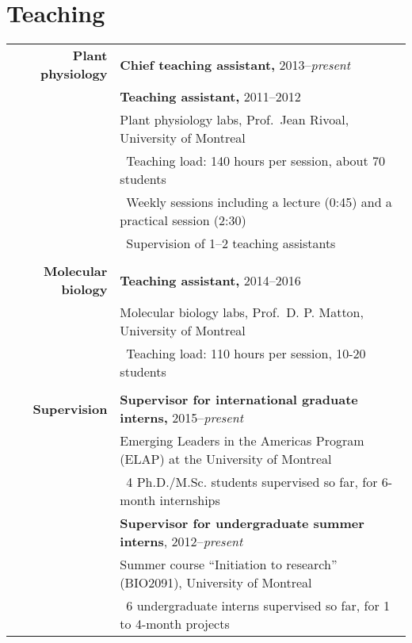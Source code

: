 \documentclass[letterpaper,10pt]{article}
\begin{document}
\bigskip
\bigskip

\section{Teaching}
\begin{tabular}{r|p{14cm}}

\textbf{Plant physiology} & \textbf{Chief teaching assistant,} 2013--\emph{present} \\
& \textbf{Teaching assistant,} 2011--2012 \\
& Plant physiology labs, Prof.~Jean Rivoal, University of Montreal
  \vspace{1mm} \\
& \textbullet{}~Teaching load: 140 hours per session, about 70 students \\
& \textbullet{}~Weekly sessions including a lecture (0:45) and a practical
  session (2:30) \\
& \textbullet{}~Supervision of 1--2 teaching assistants \\

\multicolumn{2}{c}{} \\

\textbf{Molecular biology}
& \textbf{Teaching assistant,} 2014--2016 \\
& Molecular biology labs, Prof.~D. P. Matton, University of Montreal
  \vspace{1mm} \\
& \textbullet{}~Teaching load: 110 hours per session, 10-20 students \\

\multicolumn{2}{c}{} \\

\textbf{Supervision}
& \textbf{Supervisor for international graduate interns,} 2015--\emph{present} \\
& Emerging Leaders in the Americas Program (ELAP)
  at the University of Montreal
  \vspace{1mm} \\
& \textbullet{}~4 Ph.D./M.Sc. students supervised so far, for 6-month
  internships
\vspace{2.5mm} \\

& \textbf{Supervisor for undergraduate summer interns}, 2012--\emph{present} \\
& Summer course ``Initiation to research'' (BIO2091), University of Montreal
  \vspace{1mm} \\
& \textbullet{}~6 undergraduate interns supervised so far, for 1 to
  4-month projects \\

\end{tabular}
\end{document}
